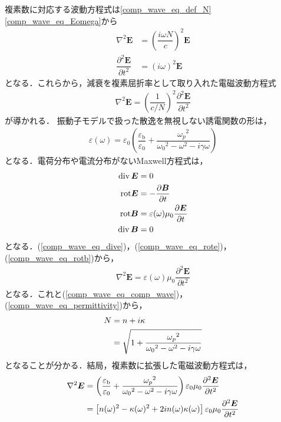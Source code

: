 複素数に対応する波動方程式は\eqref{comp_wave_eq_def_N}\eqref{comp_wave_eq_Eomega}から
\begin{align}
  \nabla^2 \boldsymbol{E} &= \left(\dfrac{i\omega{N}}{c}\right)^2 \boldsymbol{E}\\
  \dfrac{\partial^2\boldsymbol{E}}{\partial{t}^2} &= (i\omega)^2 \boldsymbol{E}
\end{align}
となる．これらから，減衰を複素屈折率として取り入れた電磁波動方程式
\begin{align}
  \nabla^2 \boldsymbol{E} = \left(\dfrac{1}{c/N}\right)^2\dfrac{\partial^2\boldsymbol{E}}{\partial{t}^2}\label{comp_wave_eq_comp_wave}
\end{align}
が導かれる．
振動子モデルで扱った散逸を無視しない誘電関数の形は，
\begin{align}
  \varepsilon(\omega)=\varepsilon_0\left(\dfrac{\varepsilon_{\text{b}}}{\varepsilon_0}+\dfrac{{\omega_p}^2}{{\omega_0}^2-\omega^2-i\gamma\omega}\right)\label{comp_wave_eq_permittivity}
\end{align}
となる．電荷分布や電流分布がないMaxwell方程式は，
\begin{align}
  \operatorname{div}{\boldsymbol{E}}&=0\label{comp_wave_eq_dive}\\
  \text{rot}{\boldsymbol{E}}&=-\dfrac{\partial\boldsymbol{B}}{\partial{t}}\label{comp_wave_eq_rote}\\
  \text{rot}{\boldsymbol{B}}&=\varepsilon(\omega)\mu_0\dfrac{\partial\boldsymbol{E}}{\partial{t}}\label{comp_wave_eq_rotb}\\
  \operatorname{div}{\boldsymbol{B}}&=0\label{comp_wave_eq_divb}
\end{align}
となる．(\ref{comp_wave_eq_dive})，(\ref{comp_wave_eq_rote})，(\ref{comp_wave_eq_rotb})から，
\begin{align}
  \nabla^2\boldsymbol{E}=\varepsilon(\omega)\mu_0\dfrac{\partial^2\boldsymbol{E}}{\partial{t}^2}
\end{align}
となる．これと(\ref{comp_wave_eq_comp_wave})，(\ref{comp_wave_eq_permittivity})から，
\begin{align}
  N &= n+i\kappa\notag\\
  &=\sqrt{1+\dfrac{{\omega_p}^2}{{\omega_0}^2-\omega^2-i\gamma\omega}}
\end{align}
となることが分かる．結局，複素数に拡張した電磁波動方程式は，
\begin{align}
  \nabla^2\boldsymbol{E} &= \left(\dfrac{\varepsilon_{\text{b}}}{\varepsilon_0}+\dfrac{{\omega_p}^2}{{\omega_0}^2-\omega^2-i\gamma\omega}\right)\varepsilon_0\mu_0\dfrac{\partial^2\boldsymbol{E}}{\partial{t}^2}\notag\\
  &= \left[n(\omega)^2-\kappa(\omega)^2+2in(\omega)\kappa(\omega)\right]\varepsilon_0\mu_0\dfrac{\partial^2\boldsymbol{E}}{\partial{t}^2}\label{comp_wave_eq_newequationE}
\end{align}

